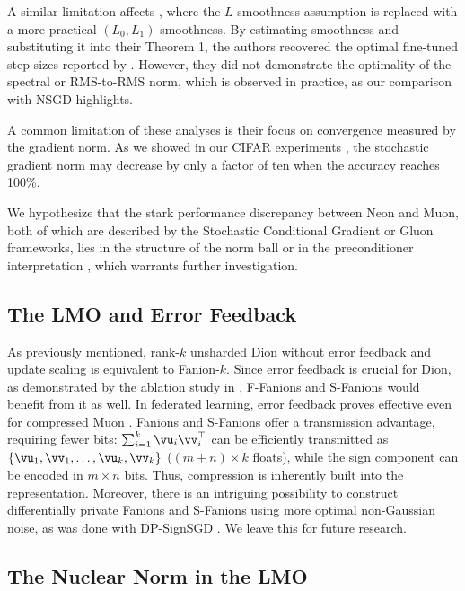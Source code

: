 \documentclass[pmlr]{jmlr}%
\begin{document}
 A similar limitation affects \citep{riabinin2025gluon}, where the $L$-smoothness assumption is replaced with a more practical $(L_0, L_1)$-smoothness. By estimating smoothness and substituting it into their Theorem 1, the authors recovered the optimal fine-tuned step sizes reported by \citep{pethick2025training}. However, they did not demonstrate the optimality of the spectral or RMS-to-RMS norm, which is observed in practice, as our comparison with NSGD highlights.
 
 A common limitation of these analyses is their focus on convergence measured by the gradient norm. As we showed in our CIFAR experiments , the stochastic gradient norm may decrease by only a factor of ten when the accuracy reaches 100\%.
 
 We hypothesize that the stark performance discrepancy between Neon and Muon, both of which are described by the Stochastic Conditional Gradient \citep{pethick2025training} or Gluon frameworks, lies in the structure of the norm ball or in the preconditioner interpretation \citep{pethick2025trainingneuralnetworksscale}, which warrants further investigation.
 
 \subsection{The LMO and Error Feedback}
 
 As previously mentioned, rank-$k$ unsharded Dion without error feedback and update scaling is equivalent to Fanion-$k$. Since error feedback is crucial for Dion, as demonstrated by the ablation study in \citep{ahn2025dion}, F-Fanions and S-Fanions would benefit from it as well. In federated learning, error feedback proves effective even for compressed Muon \citep{gruntkowska2025efmuon}. Fanions and S-Fanions offer a transmission advantage, requiring fewer bits: $\sum_{i=1}^k \vu_i \vv_i^\top$ can be efficiently transmitted as $\{\vu_1, \vv_1, \dots, \vu_k, \vv_k\}$ ($(m+n)\times k$ floats), while the sign component can be encoded in $m \times n$ bits. Thus, compression is inherently built into the representation. Moreover, there is an intriguing possibility to construct differentially private Fanions and S-Fanions using more optimal non-Gaussian noise, as was done with DP-SignSGD \citep{jang2024dplogsign}. We leave this for future research.
 
 \subsection{The Nuclear Norm in the LMO}
 
\end{document}
